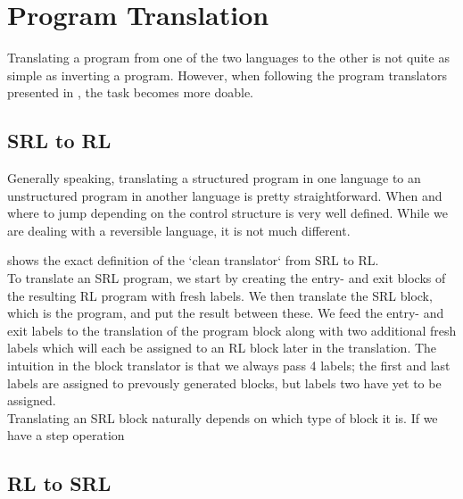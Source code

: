 \section{Program Translation}
Translating a program from one of the two languages to the other is not quite as simple as inverting a program. However, when following the program translators presented in \cite{REV}, the task becomes more doable.

\subsection{SRL to RL}

Generally speaking, translating a structured program in one language to an unstructured program in another language is pretty straightforward. When and where to jump depending on the control structure is very well defined. While we are dealing with a reversible language, it is not much different.

\cite[Fig.~21]{REV} shows the exact definition of the `clean translator` from SRL to RL.\\

\noindent To translate an SRL program, we start by creating the entry- and exit blocks of the resulting RL program with fresh labels. We then translate the SRL block, which is the program, and put the result between these. We feed the entry- and exit labels to the translation of the program block along with two additional fresh labels which will each be assigned to an RL block later in the translation. The intuition in the block translator is that we always pass 4 labels; the first and last labels are assigned to prevously generated blocks, but labels two have yet to be assigned.\\

\noindent Translating an SRL block naturally depends on which type of block it is. If we have a step operation


\noindent {}


\subsection{RL to SRL}
\noindent {}


